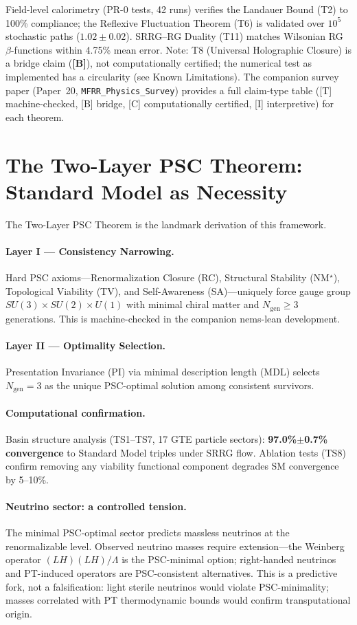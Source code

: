 \documentclass[11pt]{article}
\begin{document}
Field-level calorimetry (PR-0 tests, 42 runs) verifies the Landauer Bound (T2) to 100\% compliance; the Reflexive Fluctuation Theorem (T6) is validated over $10^5$ stochastic paths ($1.02\pm0.02$). SRRG--RG Duality (T11) matches Wilsonian RG $\beta$-functions within 4.75\% mean error. Note: T8 (Universal Holographic Closure) is a bridge claim (\textbf{[B]}), not computationally certified; the numerical test as implemented has a circularity (see Known Limitations). The companion survey paper (Paper~20, \texttt{MFRR\_Physics\_Survey}) provides a full claim-type table ([T] machine-checked, [B] bridge, [C] computationally certified, [I] interpretive) for each theorem.

\section{The Two-Layer PSC Theorem: Standard Model as Necessity}

The Two-Layer PSC Theorem is the landmark derivation of this framework.

\paragraph{Layer I --- Consistency Narrowing.}
Hard PSC axioms---Renormalization Closure (RC), Structural Stability (NM$^\star$), Topological Viability (TV), and Self-Awareness (SA)---uniquely force gauge group $SU(3)\times SU(2)\times U(1)$ with minimal chiral matter and $N_{\mathrm{gen}}\ge 3$ generations. This is machine-checked in the companion nems-lean development.

\paragraph{Layer II --- Optimality Selection.}
Presentation Invariance (PI) via minimal description length (MDL) selects $N_{\mathrm{gen}}=3$ as the unique PSC-optimal solution among consistent survivors.

\paragraph{Computational confirmation.}
Basin structure analysis (TS1--TS7, 17 GTE particle sectors): \textbf{97.0\%$\pm$0.7\% convergence} to Standard Model triples under SRRG flow. Ablation tests (TS8) confirm removing any viability functional component degrades SM convergence by 5--10\%.

\paragraph{Neutrino sector: a controlled tension.}
The minimal PSC-optimal sector predicts massless neutrinos at the renormalizable level. Observed neutrino masses require extension---the Weinberg operator $(LH)(LH)/\Lambda$ is the PSC-minimal option; right-handed neutrinos and PT-induced operators are PSC-consistent alternatives. This is a predictive fork, not a falsification: light sterile neutrinos would violate PSC-minimality; masses correlated with PT thermodynamic bounds would confirm transputational origin.
\end{document}
